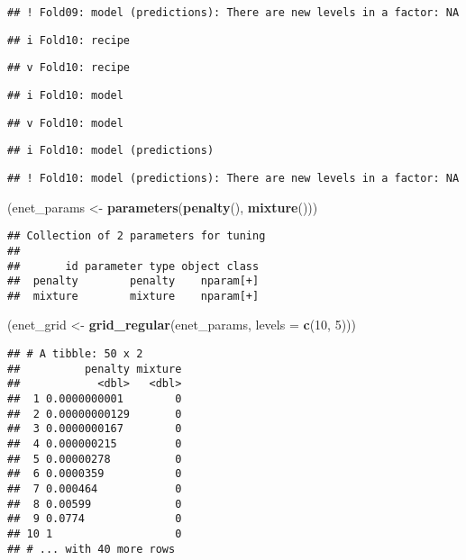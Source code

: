 \documentclass[
]{article}
\newenvironment{Shaded}{\begin{snugshade}}{\end{snugshade}}
\newcommand{\DataTypeTok}[1]{\textcolor[rgb]{0.13,0.29,0.53}{#1}}
\newcommand{\DecValTok}[1]{\textcolor[rgb]{0.00,0.00,0.81}{#1}}
\newcommand{\KeywordTok}[1]{\textcolor[rgb]{0.13,0.29,0.53}{\textbf{#1}}}
\newcommand{\NormalTok}[1]{#1}
\newcommand{\StringTok}[1]{\textcolor[rgb]{0.31,0.60,0.02}{#1}}
\begin{document}
\begin{verbatim}
## ! Fold09: model (predictions): There are new levels in a factor: NA
\end{verbatim}

\begin{verbatim}
## i Fold10: recipe
\end{verbatim}

\begin{verbatim}
## v Fold10: recipe
\end{verbatim}

\begin{verbatim}
## i Fold10: model
\end{verbatim}

\begin{verbatim}
## v Fold10: model
\end{verbatim}

\begin{verbatim}
## i Fold10: model (predictions)
\end{verbatim}

\begin{verbatim}
## ! Fold10: model (predictions): There are new levels in a factor: NA
\end{verbatim}

\begin{Shaded}
\begin{Highlighting}[]
\NormalTok{(enet_params <-}\StringTok{ }\KeywordTok{parameters}\NormalTok{(}\KeywordTok{penalty}\NormalTok{(), }\KeywordTok{mixture}\NormalTok{()))}
\end{Highlighting}
\end{Shaded}

\begin{verbatim}
## Collection of 2 parameters for tuning
## 
##       id parameter type object class
##  penalty        penalty    nparam[+]
##  mixture        mixture    nparam[+]
\end{verbatim}

\begin{Shaded}
\begin{Highlighting}[]
\NormalTok{(enet_grid <-}\StringTok{ }\KeywordTok{grid_regular}\NormalTok{(enet_params, }\DataTypeTok{levels =} \KeywordTok{c}\NormalTok{(}\DecValTok{10}\NormalTok{, }\DecValTok{5}\NormalTok{)))}
\end{Highlighting}
\end{Shaded}

\begin{verbatim}
## # A tibble: 50 x 2
##          penalty mixture
##            <dbl>   <dbl>
##  1 0.0000000001        0
##  2 0.00000000129       0
##  3 0.0000000167        0
##  4 0.000000215         0
##  5 0.00000278          0
##  6 0.0000359           0
##  7 0.000464            0
##  8 0.00599             0
##  9 0.0774              0
## 10 1                   0
## # ... with 40 more rows
\end{verbatim}
\end{document}
